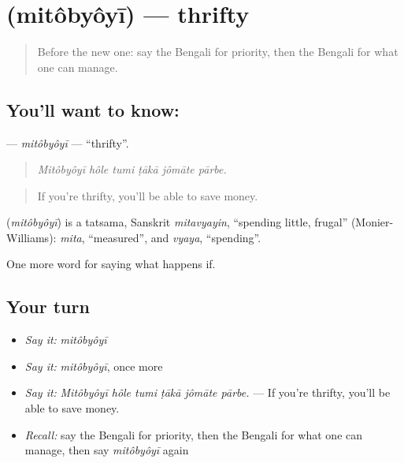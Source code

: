 \section[\texorpdfstring{\bn{মিতব্যয়ী} (mitôbyôyī)}{মিতব্যয়ী (mitôbyôyī)}]{ (mitôbyôyī) — thrifty}

\label{lesson:BN-C545-mitobyoyi}



\begin{quote}
Before the new one: say the Bengali for priority, then the Bengali for what one can manage.
\end{quote}

\subsection*{You'll want to know: }
\textbf{} — \emph{mitôbyôyī} — \textquotedblleft{}thrifty\textquotedblright{}.

\begin{quote}
     
\end{quote}

\begin{quote}
\emph{Mitôbyôyī hôle tumi ṭākā jômāte pārbe.}
\end{quote}

\begin{quote}
If you're thrifty, you'll be able to save money.
\end{quote}

\begin{cousinweb}
\textbf{} (\emph{mitôbyôyī}) is a tatsama, Sanskrit \emph{mitavyayin}, \textquotedblleft{}spending little, frugal\textquotedblright{} (Monier-Williams): \emph{mita}, \textquotedblleft{}measured\textquotedblright{}, and \emph{vyaya}, \textquotedblleft{}spending\textquotedblright{}.
\end{cousinweb}

\begin{grammarlens}[title={What you've built}]
One more word for saying what happens if.
\end{grammarlens}

\subsection*{Your turn}
\begin{itemize}
\raggedright
  \item \emph{Say it:} \emph{mitôbyôyī}
  \item \emph{Say it:} \emph{mitôbyôyī}, once more
  \item \emph{Say it:} \emph{Mitôbyôyī hôle tumi ṭākā jômāte pārbe.} — If you're thrifty, you'll be able to save money.
  \item \emph{Recall:} say the Bengali for priority, then the Bengali for what one can manage, then say \emph{mitôbyôyī} again
\end{itemize}

